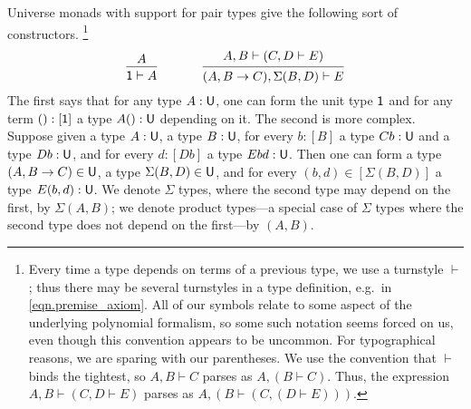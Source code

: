 \documentclass[11pt, one side, article]{memoir}
\theoremstyle{definition}
\theoremstyle{plain}
\newcommand{\tn}[1]{\textnormal{#1}}
\newcommand{\0}{\textsf{0}}
\newcommand{\1}{\tn{\textsf{1}}}
\newcommand{\U}{\tn{\textsf{U}}}
\begin{document}
Universe monads with support for pair types give the following sort of constructors.%
\footnote{Every time a type depends on terms of a previous type, we use a turnstyle $\vdash$; thus there may be several turnstyles in a type definition, e.g.\ in \eqref{eqn.premise_axiom}. All of our symbols relate to some aspect of the underlying polynomial formalism, so some such notation seems forced on us, even though this convention appears to be uncommon. For typographical reasons, we are sparing with our parentheses. We use the convention that $\vdash$ binds the tightest, so $A,B\vdash C$ parses as $A,(B\vdash C)$. Thus, the expression $A, B\vdash (C, D\vdash E)$ parses as $A,(B\vdash(C, (D\vdash E)))$.}
\begin{equation}\label{eqn.premise_axiom}
  \begin{prooftree}
    \Hypo{A}
    \Infer1{\1\vdash A}
  \end{prooftree}
\hspace{.5in}
  \begin{prooftree}
    \Hypo{A, B\vdash (C, D\vdash E)}
    \Infer1{(A,B\to C),\Sigma(B,D)\vdash E}
  \end{prooftree}
\end{equation}
The first says that for any type $A:\U$, one can form the unit type $\1$ and for any term $():[\1]$ a type $A():\U$ depending on it. The second is more complex. Suppose given a type $A:\U$, a type $B:\U$, for every $b:[B]$ a type $Cb:\U$ and a type $Db:\U$, and for every $d:[Db]$ a type $Ebd:\U$. Then one can form a type $(A,B\to C)\in \U$, a type $\Sigma(B,D)\in \U$, and for every $(b, d)\in [\Sigma(B,D)]$ a type $E(b,d):\U$. We denote $\Sigma$ types, where the second type may depend on the first, by $\Sigma(A,B)$; we denote product types---a special case of $\Sigma$ types where the second type does not depend on the first---by $(A,B)$.
\end{document}
